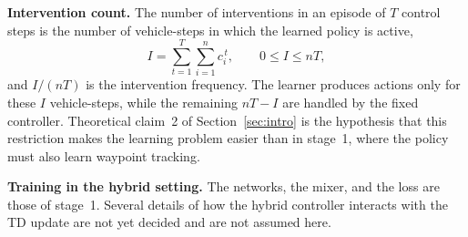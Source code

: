 \textbf{Intervention count.} The number of interventions in an episode of $T$ control steps
is the number of vehicle-steps in which the learned policy is active,
\begin{equation}
\label{eq:interventions}
I = \sum_{t=1}^{T}\sum_{i=1}^{n} c_i^{\,t},
\qquad 0 \le I \le nT ,
\end{equation}
and $I/(nT)$ is the intervention frequency.
The learner produces actions only for these $I$ vehicle-steps, while the remaining
$nT - I$ are handled by the fixed controller. Theoretical claim~2 of
Section~\ref{sec:intro} is the hypothesis that this restriction makes the learning problem
easier than in stage~1, where the policy must also learn waypoint tracking.

\textbf{Training in the hybrid setting.} The networks, the mixer, and the loss are those of
stage~1. Several details of how the hybrid controller interacts with the TD update are not
yet decided and are not assumed here.
